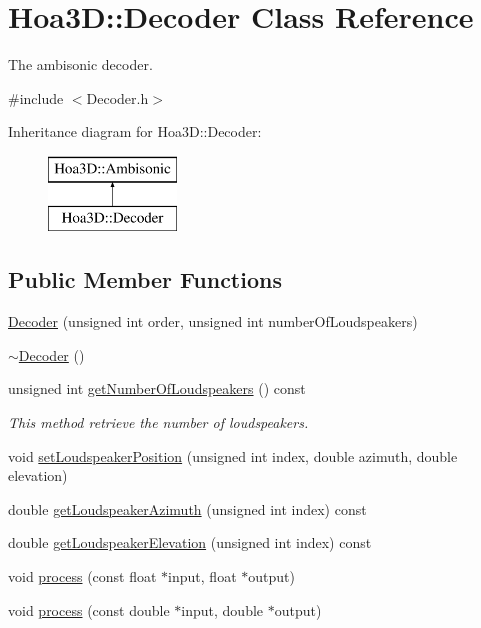 \hypertarget{class_hoa3_d_1_1_decoder}{\section{Hoa3\-D\-:\-:Decoder Class Reference}
\label{class_hoa3_d_1_1_decoder}
}


The ambisonic decoder.  




{\ttfamily \#include $<$Decoder.\-h$>$}

Inheritance diagram for Hoa3\-D\-:\-:Decoder\-:\begin{figure}[H]
\begin{center}
\leavevmode
\includegraphics[height=2.000000cm]{class_hoa3_d_1_1_decoder}
\end{center}
\end{figure}
\subsection*{Public Member Functions}
\begin{DoxyCompactItemize}
\item 
\hyperlink{class_hoa3_d_1_1_decoder_aefb3c6a2fd27592480d8198c06ea0968}{Decoder} (unsigned int order, unsigned int number\-Of\-Loudspeakers)
\item 
\hyperlink{class_hoa3_d_1_1_decoder_acc197bebb310a82756ee2061fe371e2d}{$\sim$\-Decoder} ()
\item 
unsigned int \hyperlink{class_hoa3_d_1_1_decoder_a4b14ee0651b397724490de7199d428a7}{get\-Number\-Of\-Loudspeakers} () const 
\begin{DoxyCompactList}\small\item\em This method retrieve the number of loudspeakers. \end{DoxyCompactList}\item 
void \hyperlink{class_hoa3_d_1_1_decoder_ade9c4f54765c1de0f27fadf0b25e88f9}{set\-Loudspeaker\-Position} (unsigned int index, double azimuth, double elevation)
\item 
double \hyperlink{class_hoa3_d_1_1_decoder_a23df7388f6d6b2915566f5aa6d294056}{get\-Loudspeaker\-Azimuth} (unsigned int index) const 
\item 
double \hyperlink{class_hoa3_d_1_1_decoder_aa5102482919297cee85af49991c5984f}{get\-Loudspeaker\-Elevation} (unsigned int index) const 
\item 
void \hyperlink{class_hoa3_d_1_1_decoder_a146f985ebda8e825db2a2ed2cafd5ba6}{process} (const float $\ast$input, float $\ast$output)
\item 
void \hyperlink{class_hoa3_d_1_1_decoder_a2a1931b2fe5c5def0baa9c4d637379a9}{process} (const double $\ast$input, double $\ast$output)
\end{DoxyCompactItemize}


